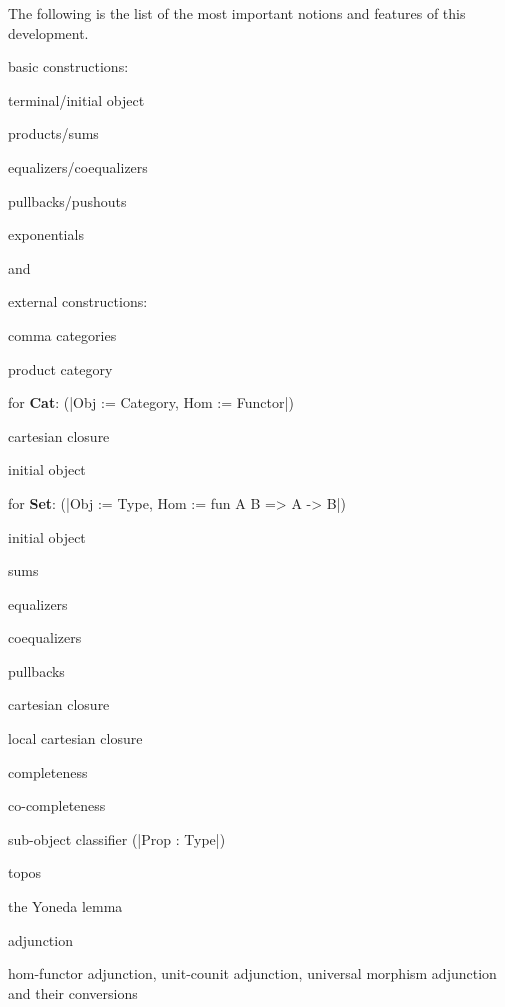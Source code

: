 \documentclass[9pt, twocolumn]{extarticle}
\renewenvironment{itemize}[1]{\begin{compactitem}#1}{\end{compactitem}}
\begin{document}
The following is the list of the most important notions and features of this development.
\begin{itemize}[\tiny]
\item basic constructions:
	\begin{itemize}
	 \item terminal/initial object
	 \item products/sums
	 \item equalizers/coequalizers
	 \item pullbacks/pushouts
	 \item exponentials
	 \item  and 
	\end{itemize}
\item external constructions:
	\begin{itemize}
	 \item comma categories
	 \item product category
	\end{itemize}
\item for \textbf{Cat}: (\Coqe|Obj := Category, Hom := Functor|)
	\begin{itemize}
	 \item cartesian closure
	 \item initial object
	\end{itemize}
\item for \textbf{Set}: (\Coqe|Obj := Type, Hom := fun A B => A -> B|)
	\begin{itemize}
	 \item initial object
	 \item sums
	 \item equalizers
	 \item coequalizers\textsuperscript{}
	 \item pullbacks
	 \item cartesian closure
	 \item local cartesian closure\textsuperscript{}
	 \item completeness
	 \item co-completeness\textsuperscript{}
	 \item sub-object classifier (\Coqe|Prop : Type|)\textsuperscript{}
	 \item topos\textsuperscript{}
	\end{itemize}
\item the Yoneda lemma
\item adjunction
	\begin{itemize}
	\item hom-functor adjunction, unit-counit adjunction, universal morphism adjunction and their conversions

\end{itemize}
\end{itemize}
\end{document}
